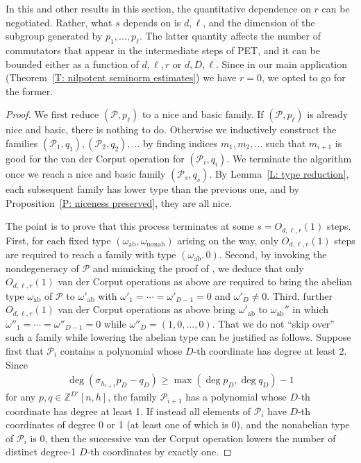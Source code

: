 \documentclass[11pt]{amsart}
\theoremstyle{definition}
\newcommand{\Z}{{\mathbb Z}}
\newcommand{\CP}{{\mathcal P}}
\newcommand{\1}{{\mathbf{1}}}
\newcommand{\ab}{{\mathrm{ab}}}
\newcommand{\nab}{{\mathrm{nonab}}}
\begin{document}
In this and other results in this section, the quantitative dependence on $r$ can be negotiated. Rather, what $s$ depends on is $d, \ell$, and the dimension of the subgroup generated by $p_1, \ldots, p_\ell$. The latter quantity affects the number of commutators that appear in the intermediate steps of PET, and it can be bounded either as a function of $d,\ell, r$ or $d,D,\ell$. Since in our main application (Theorem~\ref{T: nilpotent seminorm estimates}) we have $r = 0$, we opted to go for the former. 
\begin{proof}
We first reduce $(\CP,p_\ell)$ to a nice and basic family.
    If $(\CP,p_\ell)$ is already nice and basic, there is nothing to do. Otherwise we inductively construct the families $(\CP_1, q_1), (\CP_2, q_2), \ldots$ by finding indices $m_1, m_2, \ldots$ such that $m_{i+1}$ is good for the van der Corput operation for $(\CP_i,q_i)$. We terminate the algorithm once we reach a nice and basic family $(\CP_s,q_s)$. By Lemma~\ref{L: type reduction}, each subsequent family has lower type than the previous one, and by Proposition~\ref{P: niceness preserved}, they are all nice. 
    
     The point is to prove that this process terminates at some $s=O_{d,\ell,r}(1)$ steps. First, for each fixed type $(\omega_\ab,\omega_\nab)$ arising on the way, only $O_{d, \ell,r}(1)$ steps are required to reach a family with type $(\omega_\ab,0)$. 
    Second, by invoking the nondegeneracy of $\CP$ and mimicking the proof of \cite[Lemma~4.5]{CFH11}, we deduce that only $O_{d, \ell,r}(1)$ van der Corput operations as above are required to bring the abelian type $\omega_\ab$ of $\CP$ to $\omega'_\ab$ with $\omega'_1 = \cdots = \omega'_{D-1} = 0$ and $\omega'_D\neq 0$. Third, further $O_{d, \ell,r}(1)$ van der Corput operations as above bring $\omega'_\ab$ to $\omega_\ab''$ in which $\omega''_1 = \cdots = \omega''_{D-1} = 0$ while $\omega''_{D}=(1,0,\ldots, 0)$. That we do not ``skip over'' such a family while lowering the abelian type can be justified as follows. Suppose first that $\CP_i$ contains a polynomial whose $D$-th coordinate has degree at least 2. Since
    \begin{align*}
     \deg (\sigma_{h_{r+1}} p_D-q_D)\geq \max(\deg p_D,\deg q_D)-1   
    \end{align*}
    for any $p,q\in\Z^{D'}[n,h]$, the family $\CP_{i+1}$ has a polynomial whose $D$-th coordinate has degree at least 1. If instead all elements of $\CP_i$ have $D$-th coordinates of degree 0 or 1 (at least one of which is 0), and the nonabelian type of $\CP_i$ is 0, then the successive van der Corput operation lowers the number of distinct degree-1 $D$-th coordinates by exactly one.



\end{proof}
\end{document}
